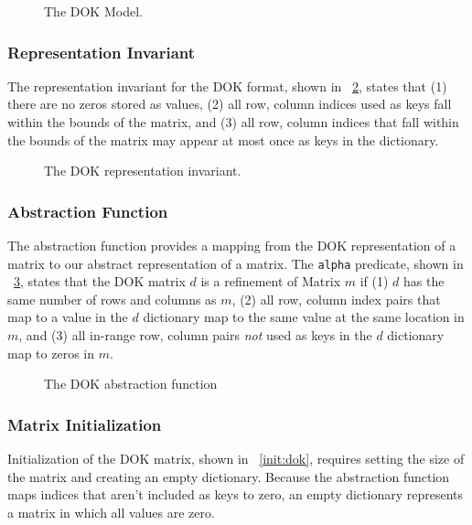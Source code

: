 \begin{figure}
\centering

\caption{The DOK Model.}
\label{model:dok}
\end{figure}

\subsubsection{Representation Invariant}

The representation invariant for the DOK format, shown in \figurename~\ref{repinv:dok}, states that (1) there are no zeros stored as values, (2) all row, column indices used as keys fall within the bounds of the matrix, and (3) all row, column indices that fall within the bounds of the matrix may appear at most once as keys in the dictionary.

\begin{figure}
\centering

\caption{The DOK representation invariant.}
\label{repinv:dok}
\end{figure}

\subsubsection{Abstraction Function}

The abstraction function provides a mapping from the DOK representation of a matrix to our abstract representation of a matrix.  The \texttt{alpha} predicate, shown in \figurename~\ref{alpha:dok}, states that the DOK matrix $d$ is a refinement of Matrix $m$ if (1) $d$ has the same number of rows and columns as $m$, (2) all row, column index pairs that map to a value in the $d$ dictionary map to the same value at the same location in $m$, and (3) all in-range row, column pairs \emph{not} used as keys in the $d$ dictionary map to zeros in $m$.

\begin{figure}
\centering

\caption{The DOK abstraction function}
\label{alpha:dok}
\end{figure}

\subsubsection{Matrix Initialization}

Initialization of the DOK matrix, shown in \figurename~\ref{init:dok}, requires setting the size of the matrix and creating an empty dictionary.  Because the abstraction function maps indices that aren't included as keys to zero, an empty dictionary represents a matrix in which all values are zero.

